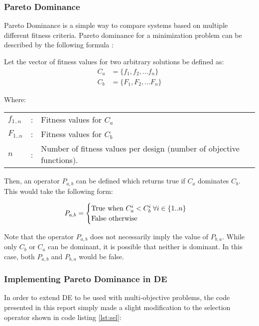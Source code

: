 \subsubsection{Pareto Dominance}
Pareto Dominance is a simple way to compare systems based on multiple different fitness criteria. Pareto dominance for a minimization problem can be described by the following formula \cite{diff-evol}: 

Let the vector of fitness values for two arbitrary solutions be defined as:
\begin{align*}
	C_a &= \{ f_1, f_2, ... f_n \}\\
	C_b &= \{ F_1, F_2, ... F_n\}
\end{align*}

Where:
\begin{center}
\begin{tabular}{lcl}
	$f_{1..n}$ & : & Fitness values for $C_a$\\
	$F_{1..n}$ & : & Fitness values for $C_b$\\
	$n$ & : & Number of fitness values per design (number of objective functions). 
\end{tabular}
\end{center}

Then, an operator $P_{a,b}$ can be defined which returns true if $C_a$ dominates $C_b$. This would take the following form:

\begin{equation}
P_{a,b} = \begin{cases}
          \hbox{True  when  } C_{a}^i < C_{b}^i \; \forall i \in \{1..n\}\\ 
          \hbox{False otherwise}
          \end{cases}
\end{equation}

Note that the operator $P_{a,b}$ does not necessarily imply the value of $P_{b,a}$. While only $C_b$ or $C_a$ can be dominant, it is possible that neither is dominant. In this case, both $P_{a,b}$ and $P_{b,a}$ would be false\cite{diff-evol}. 

\subsubsection{Implementing Pareto Dominance in DE}

In order to extend DE to be used with multi-objective problems, the code presented in this report simply made a slight modification to the selection operator shown in code listing \ref{lst:sel}:


